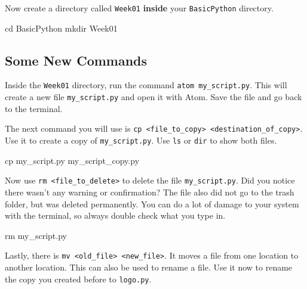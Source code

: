 \noindent Now create a directory called \texttt{Week01} \textbf{inside} your \texttt{BasicPython} directory.

\vspace{1em}

\begin{solution}
    \begin{outputcode}
cd BasicPython
mkdir Week01
    \end{outputcode}
\end{solution}

\subsection{Some New Commands}

Inside the \texttt{Week01} directory, run the command \texttt{atom my\_script.py}. This will create a new file \texttt{my\_script.py} and open it with Atom. Save the file and go back to the terminal.

\vspace{1em}

\noindent The next command you will use is \texttt{cp <file\_to\_copy> <destination\_of\_copy>}. Use it to create a copy of \texttt{my\_script.py}. Use \texttt{ls} or \texttt{dir} to show both files.

\vspace{1em}

\begin{solution}
    \begin{outputcode}
cp my_script.py my_script_copy.py
    \end{outputcode}
\end{solution}

\noindent Now use \texttt{rm <file\_to\_delete>} to delete the file \texttt{my\_script.py}. Did you notice there wasn't any warning or confirmation? The file also did not go to the trash folder, but was deleted permanently. You can do a lot of damage to your system with the terminal, so always double check what you type in.

\vspace{1em}

\begin{solution}
    \begin{outputcode}
rm my_script.py
    \end{outputcode}
\end{solution}

\noindent Lastly, there is \texttt{mv <old\_file> <new\_file>}. It moves a file from one location to another location. This can also be used to rename a file. Use it now to rename the copy you created before to \texttt{logo.py}.

